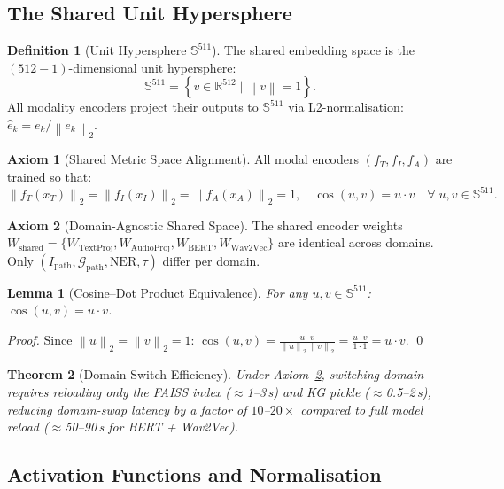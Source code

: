 \documentclass[12pt,a4paper]{article}
\theoremstyle{definition}
\newtheorem{definition}{Definition}[section]
\newtheorem{axiom}{Axiom}[section]
\theoremstyle{plain}
\newtheorem{theorem}{Theorem}[section]
\newtheorem{lemma}[theorem]{Lemma}
\theoremstyle{remark}
\newcommand{\R}{\mathbb{R}}
\newcommand{\Sph}{\mathbb{S}}
\newcommand{\Norm}[1]{\left\|#1\right\|}
\newcommand{\KG}{\mathcal{G}}
\begin{document}
\subsection{The Shared Unit Hypersphere}

\begin{definition}[Unit Hypersphere $\Sph^{511}$]
The shared embedding space is the $(512{-}1)$-dimensional unit hypersphere:
\[
  \Sph^{511} = \left\{v \in \R^{512} \;\Big|\; \Norm{v} = 1\right\}.
\]
All modality encoders project their outputs to $\Sph^{511}$ via L2-normalisation: $\hat{e}_k = e_k / \Norm{e_k}_2$.
\end{definition}

\begin{axiom}[Shared Metric Space Alignment]
All modal encoders $(f_T, f_I, f_A)$ are trained so that:
\[
  \Norm{f_T(x_T)}_2 = \Norm{f_I(x_I)}_2 = \Norm{f_A(x_A)}_2 = 1, \quad
  \cos(u,v) = u \cdot v \quad \forall\; u,v \in \Sph^{511}.
\]
\end{axiom}

\begin{axiom}[Domain-Agnostic Shared Space]
\label{ax:shared}
The shared encoder weights
$W_{\text{shared}} = \{W_{\text{TextProj}}, W_{\text{AudioProj}}, W_{\text{BERT}}, W_{\text{Wav2Vec}}\}$
are identical across domains. Only $(I_{\text{path}}, \KG_{\text{path}}, \text{NER}, \tau)$ differ per domain.
\end{axiom}

\begin{lemma}[Cosine--Dot Product Equivalence]
\label{lem:cosdot}
For any $u, v \in \Sph^{511}$: $\cos(u, v) = u \cdot v$.
\end{lemma}
\begin{proof}
Since $\Norm{u}_2 = \Norm{v}_2 = 1$:
$\cos(u,v) = \frac{u \cdot v}{\Norm{u}_2\,\Norm{v}_2} = \frac{u \cdot v}{1 \cdot 1} = u \cdot v.$ \qed
\end{proof}

\begin{theorem}[Domain Switch Efficiency]
\label{thm:switch}
Under Axiom~\ref{ax:shared}, switching domain requires reloading only the FAISS index ($\approx$1--3\,s) and KG pickle ($\approx$0.5--2\,s), reducing domain-swap latency by a factor of $10$--$20\times$ compared to full model reload ($\approx$50--90\,s for BERT + Wav2Vec).
\end{theorem}

\subsection{Activation Functions and Normalisation}
\end{document}
